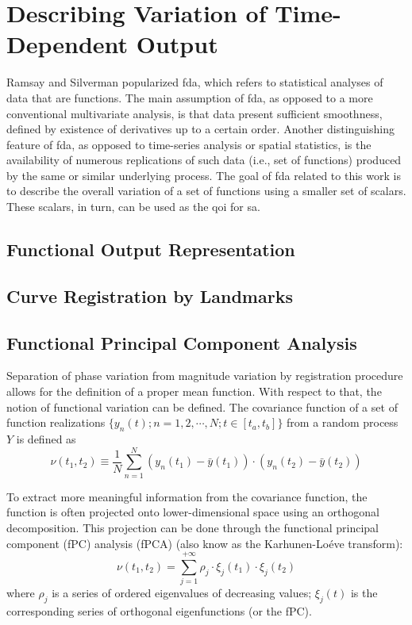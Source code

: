 \section{Describing Variation of Time-Dependent Output}\label{sec:sa_time_dependent_variation}

Ramsay and Silverman \cite{Ramsay2005} popularized \gls{fda}, which refers to statistical analyses of data that are functions.
The main assumption of \gls{fda}, as opposed to a more conventional multivariate analysis, is that data present sufficient smoothness, defined by existence of derivatives up to a certain order.
Another distinguishing feature of \gls{fda}, as opposed to time-series analysis or spatial statistics, is the availability of numerous replications of such data (i.e., set of functions) produced by the same or similar underlying process. 
The goal of \gls{fda} related to this work is to describe the overall variation of a set of functions using a smaller set of scalars.
These scalars, in turn, can be used as the \gls{qoi} for \gls{sa}.

\subsection{Functional Output Representation}\label{sub:sa_spline}

\subsection{Curve Registration by Landmarks}\label{sub:sa_registration}

\subsection{Functional Principal Component Analysis}\label{sub:sa_fpca}

Separation of phase variation from magnitude variation by registration procedure allows for the definition of a proper mean function.
With respect to that, the notion of functional variation can be defined.
The covariance function of a set of function realizations $\{y_n(t);n = 1, 2, \cdots, N; t \in [t_a,t_b]\}$ from a random process $Y$ is defined as
\begin{equation}
	\nu (t_1, t_2) \equiv \frac{1}{N} \sum_{n=1}^{N} (y_n(t_1) - \bar{y}(t_1)) \cdot (y_n(t_2) - \bar{y}(t_2))
\label{eq:covariance_function}
\end{equation}

To extract more meaningful information from the covariance function, the function is often projected onto lower-dimensional space using an orthogonal decomposition.
This projection can be done through the functional principal component (fPC) analysis (fPCA) (also know as the Karhunen-Lo\'eve transform):
\begin{equation}
	\nu (t_1, t_2) = \sum_{j=1}^{+\infty} \rho_j \cdot \xi_j(t_1) \cdot \xi_j(t_2)
\label{eq:kl_transform}
\end{equation}
where $\rho_j$ is a series of ordered eigenvalues of decreasing values; 
$\xi_j(t)$ is the corresponding series of orthogonal eigenfunctions (or the fPC).